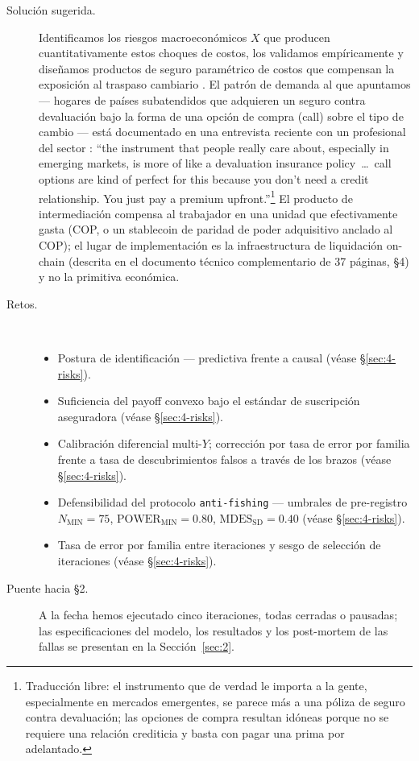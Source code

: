\documentclass[11pt,a4paper]{article}
\theoremstyle{plain}
\begin{document}
\begin{description}
  \item[Solución sugerida.] Identificamos los riesgos macroeconómicos \(X\) que producen cuantitativamente estos choques de costos, los validamos empíricamente y diseñamos productos de seguro paramétrico de costos que compensan la exposición al traspaso cambiario \citep{carter_etal_2017,mahul_stutley_2010,clarke_2016}. El patrón de demanda al que apuntamos --- hogares de países subatendidos que adquieren un seguro contra devaluación bajo la forma de una opción de compra (call) sobre el tipo de cambio --- está documentado en una entrevista reciente con un profesional del sector \citep{depreciation_insurance_talk}: ``the instrument that people really care about, especially in emerging markets, is more of like a devaluation insurance policy~\ldots~call options are kind of perfect for this because you don't need a credit relationship. You just pay a premium upfront.''\footnote{Traducción libre: el instrumento que de verdad le importa a la gente, especialmente en mercados emergentes, se parece más a una póliza de seguro contra devaluación; las opciones de compra resultan idóneas porque no se requiere una relación crediticia y basta con pagar una prima por adelantado.} El producto de intermediación compensa al trabajador en una unidad que efectivamente gasta (COP, o un stablecoin de paridad de poder adquisitivo anclado al COP); el lugar de implementación es la infraestructura de liquidación on-chain (descrita en el documento técnico complementario de 37 páginas, \S4) y no la primitiva económica.
  \item[Retos.]\hfill\\
  \begin{itemize}
    \item Postura de identificación --- predictiva frente a causal (véase \S\ref{sec:4-risks}).
    \item Suficiencia del payoff convexo bajo el estándar de suscripción aseguradora (véase \S\ref{sec:4-risks}).
    \item Calibración diferencial multi-\(Y\); corrección por tasa de error por familia frente a tasa de descubrimientos falsos a través de los brazos (véase \S\ref{sec:4-risks}).
    \item Defensibilidad del protocolo \texttt{anti-fishing} --- umbrales de pre-registro \(N_{\mathrm{MIN}}=75\), \(\mathrm{POWER}_{\mathrm{MIN}}=0.80\), \(\mathrm{MDES}_{\mathrm{SD}}=0.40\) (véase \S\ref{sec:4-risks}).
    \item Tasa de error por familia entre iteraciones y sesgo de selección de iteraciones (véase \S\ref{sec:4-risks}).
  \end{itemize}
  \item[Puente hacia \S2.] A la fecha hemos ejecutado cinco iteraciones, todas cerradas o pausadas; las especificaciones del modelo, los resultados y los post-mortem de las fallas se presentan en la Sección~\ref{sec:2}.
\end{description}
\end{document}
